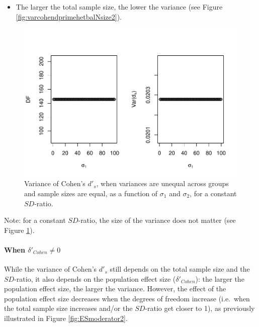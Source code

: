 \documentclass[
  man]{apa6}
\providecommand{\tightlist}{%
  \setlength{\itemsep}{0pt}\setlength{\parskip}{0pt}}
\begin{document}
\begin{itemize}
\tightlist
\item
  The larger the total sample size, the lower the variance (see Figure \ref{fig:varcohendprimehetbalNsize2}).
\end{itemize}

\begin{figure}
\centering
\includegraphics{Theoretical-Variance-of-all-estimators-as-a-function-of-population-parameters_files/figure-latex/varcohendprimehetbalvariance2-1.pdf}
\caption{\label{fig:varcohendprimehetbalvariance2}Variance of Cohen's \(d'_s\), when variances are unequal across groups and sample sizes are equal, as a function of \(\sigma_1\) and \(\sigma_2\), for a constant \(SD\)-ratio.}
\end{figure}

Note: for a constant \(SD\)-ratio, the size of the variance does not matter (see Figure \ref{fig:varcohendprimehetbalvariance2}).

\hypertarget{when-delta_cohen-neq-0-1}{%
\paragraph{\texorpdfstring{When \(\delta'_{Cohen} \neq 0\)}{When \textbackslash delta'\_\{Cohen\} \textbackslash neq 0}}\label{when-delta_cohen-neq-0-1}}

While the variance of Cohen's \(d'_s\) still depends on the total sample size and the \(SD\)-ratio, it also depends on the population effect size (\(\delta'_{Cohen}\)): the larger the population effect size, the larger the variance. However, the effect of the population effect size decreases when the degrees of freedom increase (i.e.~when the total sample size increases and/or the \(SD\)-ratio get closer to 1), as previously illustrated in Figure \ref{fig:ESmoderator2}.
\end{document}
